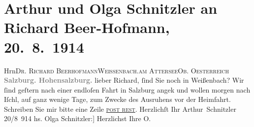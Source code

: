 

         
         \renewcommand{\erwaehntePersonen}{Personen: Richard Beer-Hofmann, Olga Schnitzler}
         \renewcommand{\erwaehnteOrte}{Orte: Attersee, Bad Ischl, Festung Hohensalzburg, Oberösterreich, Salzburg, Weißenbach am Attersee}
         \renewcommand{\erwaehnteWerke}{}
               \section[Arthur und Olga Schnitzler an Richard Beer-Hofmann, 20. 8. 1914]{ Arthur und Olga Schnitzler an Richard Beer-Hofmann, 20. 8. 1914}\nopagebreak{}\rehead{ }\begin{ledgroupsized}[t]{13cm}\normalsize\beginnumbering \toendnotes[C]{\smallbreak\pagebreak[2]} 
\pstart{}{\pb}Hrn\pend{}\pstart{}\textsc{Dr. Richard Beerhofmann}\pend{}\pstart{}\textsc{Weißenbach.}\pend{}\pstart{}\textsc{am Attersee}\pend{}\pstart{}\textsc{Ob. Oesterreich}\pend{}{\bigskip}\pstart
           \noindent{}\centering{}{\pb}\textcolor{gray}{\textbf{Salzburg. Hohensalzburg.}}\pend
           \pstart
           {\pb}lieber Richard, ſind Sie noch in Weißenbach? Wir ſind geſtern nach einer endloſen Fahrt in Salzburg angek und wollen morgen nach Iſchl, auf ganz
               wenige Tage, zum Zwecke des Ausruhens vor der Heimfahrt. Schreiben Sie mir bitte eine
               Zeile \textsc{\uline{post rest}}. Herzlichſt Ihr\pend
           \pstart \spacefill\mbox{Arthur Schnitzler}\pend{}\pstart
           \raggedleft{}20/8 914\pend
           \pstart
           \noindent{}{[}hs. Olga Schnitzler:{]} Herzlichst Ihre\pend
           \pstart \spacefill\mbox{O.}\pend{}
         
         \endnumbering{}\end{ledgroupsized}  \newcommand{\dateiname}{L02192}\newcommand{\titel}{Arthur und Olga Schnitzler an Richard Beer-Hofmann, 20. 8. 1914}\newcommand{\editorInnen}{Martin Anton Müller und Gerd-Hermann Susen}
      